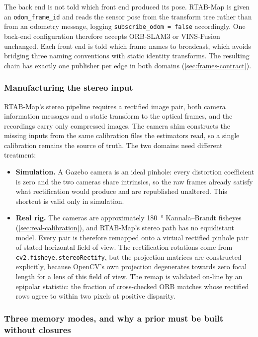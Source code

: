 The back end is not told which front end produced its pose. RTAB-Map is given an
\texttt{odom\_frame\_id} and reads the sensor pose from the transform tree rather
than from an odometry message, logging \texttt{subscribe\_odom = false}
accordingly. One back-end configuration therefore accepts ORB-SLAM3 or
VINS-Fusion unchanged. Each front end is told which frame names to broadcast,
which avoids bridging three naming conventions with static identity transforms.
The resulting chain has exactly one publisher per edge in both domains
(\cref{sec:frames-contract}).

\subsubsection{Manufacturing the stereo input}

RTAB-Map's stereo pipeline requires a rectified image pair, both camera
information messages and a static transform to the optical frames, and the
recordings carry only compressed images. The camera shim constructs the
missing inputs from the same calibration files the estimators
read, so a single calibration remains the source of truth. The two domains need
different treatment:

\begin{itemize}
  \item \textbf{Simulation.} A Gazebo camera is an ideal pinhole: every
    distortion coefficient is zero and the two cameras share intrinsics, so the
    raw frames already satisfy what rectification would produce and are
    republished unaltered. This shortcut is valid only in simulation.
  \item \textbf{Real rig.} The cameras are approximately \SI{180}{\degree}
    Kannala--Brandt fisheyes (\cref{sec:real-calibration}), and RTAB-Map's
    stereo path has no equidistant model. Every pair is therefore remapped onto
    a virtual rectified pinhole pair of stated horizontal field of view. The
    rectification rotations come from \texttt{cv2.fisheye.stereoRectify}, but
    the projection matrices are constructed explicitly, because OpenCV's own
    projection degenerates towards zero focal length for a lens of this field of
    view. The remap is validated on-line by an epipolar statistic: the fraction
    of cross-checked ORB matches whose rectified rows agree to within two pixels
    at positive disparity.
\end{itemize}

\subsubsection{Three memory modes, and why a prior must be built without
closures}

